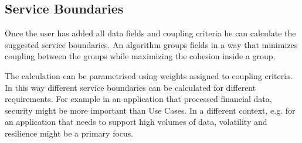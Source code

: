 \subsection{Service Boundaries}

Once the user has added all data fields and coupling criteria he can calculate the suggested service boundaries. An algorithm groups fields in a way that minimizes coupling between the groups while maximizing the cohesion inside a group.

The calculation can be parametrised using weights assigned to coupling criteria. In this way different service boundaries can be calculated for different requirements. For example in an application that processed financial data, security might be more important than Use Cases. In a different context, e.g. for an application that needs to support high volumes of data, volatility and resilience might be a primary focus.